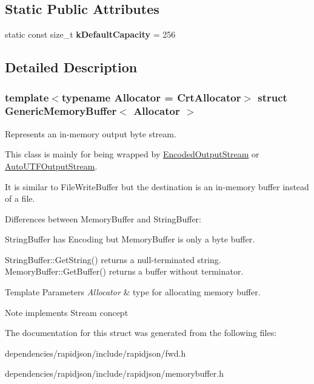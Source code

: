 \subsection*{Static Public Attributes}
\begin{DoxyCompactItemize}
\item 
\mbox{\label{struct_generic_memory_buffer_af6ecdbdbb8d3aa53cdef6e788e4980be}} 
static const size\+\_\+t {\bfseries k\+Default\+Capacity} = 256
\end{DoxyCompactItemize}


\subsection{Detailed Description}
\subsubsection*{template$<$typename Allocator = Crt\+Allocator$>$\newline
struct Generic\+Memory\+Buffer$<$ Allocator $>$}

Represents an in-\/memory output byte stream. 

This class is mainly for being wrapped by \hyperlink{class_encoded_output_stream}{Encoded\+Output\+Stream} or \hyperlink{class_auto_u_t_f_output_stream}{Auto\+U\+T\+F\+Output\+Stream}.

It is similar to File\+Write\+Buffer but the destination is an in-\/memory buffer instead of a file.

Differences between Memory\+Buffer and String\+Buffer\+:
\begin{DoxyEnumerate}
\item String\+Buffer has Encoding but Memory\+Buffer is only a byte buffer.
\item String\+Buffer\+::\+Get\+String() returns a null-\/terminated string. Memory\+Buffer\+::\+Get\+Buffer() returns a buffer without terminator.
\end{DoxyEnumerate}


\begin{DoxyTemplParams}{Template Parameters}
{\em Allocator} & type for allocating memory buffer. \\
\hline
\end{DoxyTemplParams}
\begin{DoxyNote}{Note}
implements Stream concept 
\end{DoxyNote}


The documentation for this struct was generated from the following files\+:\begin{DoxyCompactItemize}
\item 
dependencies/rapidjson/include/rapidjson/fwd.\+h\item 
dependencies/rapidjson/include/rapidjson/memorybuffer.\+h\end{DoxyCompactItemize}

